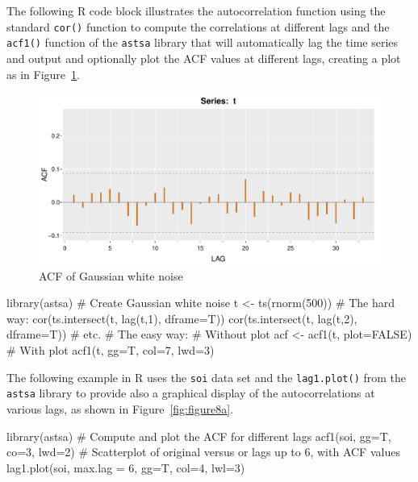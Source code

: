 The following R code block illustrates the autocorrelation function using the standard \texttt{cor()} function to compute the correlations at different lags and the \texttt{acf1()} function of the \texttt{astsa} library that will automatically lag the time series and output and optionally plot the ACF values at different lags, creating a plot as in Figure~\ref{fig:figure7a}.

\begin{figure}
\centering
\includegraphics[width=.75\textwidth]{figure7a.pdf}
\caption{ACF of Gaussian white noise}
\label{fig:figure7a}
\end{figure}

\begin{samepage}
\begin{Rcode}
library(astsa)
# Create Gaussian white noise
t <- ts(rnorm(500))
# The hard way:
cor(ts.intersect(t, lag(t,1), dframe=T))
cor(ts.intersect(t, lag(t,2), dframe=T))
# etc.
# The easy way:
# Without plot
acf <- acf1(t, plot=FALSE)
# With plot
acf1(t, gg=T, col=7, lwd=3)
\end{Rcode}
\end{samepage}

The following example in R uses the \texttt{soi} data set and the \texttt{lag1.plot()} from the \texttt{astsa} library to provide also a graphical display of the autocorrelations at various lags, as shown in Figure~\ref{fig:figure8a}.

\begin{samepage}
\begin{Rcode}
library(astsa)
# Compute and plot the ACF for different lags
acf1(soi, gg=T, co=3, lwd=2)
# Scatterplot of original versus or lags up to 6, with ACF values
lag1.plot(soi, max.lag = 6, gg=T, col=4, lwl=3)
\end{Rcode}
\end{samepage}


